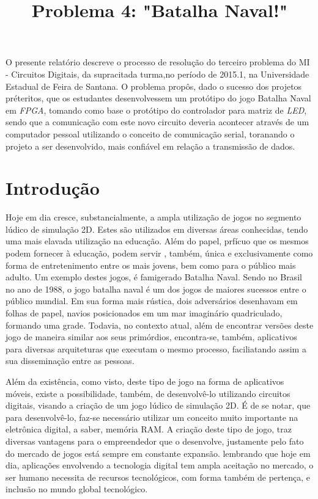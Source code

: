 \documentclass[12pt]{article}
\title{Problema 4: "Batalha Naval!"}
\begin{document}
 

\maketitle

\begin{resumo} 
O presente relatório descreve o processo de resolução do terceiro problema do MI - Circuitos Digitais, da supracitada turma,no período de 2015.1, na Universidade Estadual de Feira de Santana. O problema propôs, dado o sucesso dos projetos préteritos, que os estudantes desenvolvessem um protótipo do jogo Batalha Naval em \textit{FPGA}, tomando como base o  protótipo do controlador para matriz de \textit{LED}, sendo que a comunicação com este novo circuito deveria acontecer através de um computador pessoal utilizando o conceito de comunicação serial, toranando o projeto a ser desenvolvido, mais confiável em relação a transmissão de dados.
\end{resumo}

\section{Introdução} \label{sec:firstpage}

Hoje em dia cresce, substancialmente, a ampla utilização de jogos no segmento lúdico de simulação 2D. Estes são utilizados em diversas áreas conhecidas, tendo uma mais elavada utilização na educação. Além do papel, prfícuo que os mesmos podem fornecer à educação, podem servir , também, única e exclusivamente como forma de entretenimento entre os mais jovens, bem como para o público mais adulto. Um exemplo destes jogos, é famigerado Batalha Naval. Sendo no Brasil no ano de 1988, o jogo batalha naval é um dos jogos de maiores sucessos entre o público mundial. Em sua forma mais rústica, dois adversários desenhavam em folhas de papel, navios posicionados em um mar imaginário quadriculado, formando uma grade. Todavia, no contexto atual, além de encontrar versões deste jogo de maneira similar aos seus primórdios, encontra-se, também, aplicativos para diversas arquiteturas que executam o mesmo processo, faciliatando assim a sua disseminação entre as pessoas.

Além da existência, como visto, deste tipo de jogo na forma de aplicativos móveis, existe a possibilidade, também, de desenvolvê-lo utilizando circuitos digitais, visando a criação de um jogo lúdico de simulação 2D.  É de se notar, que para desenvolvê-lo, faz-se necessário utilizar um conceito muito importante na eletrônica digital, a saber, memória RAM. A criação deste tipo de jogo, traz diversas vantagens para o empreendedor que o desenvolve, justamente pelo fato do mercado de jogos está sempre em constante expansão. lembrando que hoje em dia, aplicações envolvendo a tecnologia digital tem ampla aceitação no mercado, o ser humano necessita de recursos tecnológicos, com forma também de pertença, e inclusão no mundo global tecnológico. 
\end{document}
